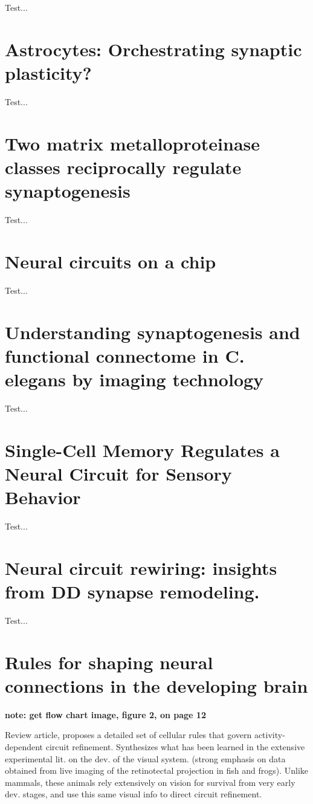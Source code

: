 \documentclass[11pt, a4paper, oneside]{article}   	%
\begin{document}
Test...

\section{Astrocytes: Orchestrating synaptic plasticity? \cite{DePitta2016}}

Test...

\section{Two matrix metalloproteinase classes reciprocally regulate synaptogenesis \cite{Dear2015}}

Test...

\section{Neural circuits on a chip \cite{Hasan2016}}

Test...

\section{Understanding synaptogenesis and functional connectome in C. elegans by imaging technology \cite{Hong2016}}

Test...

\section{Single-Cell Memory Regulates a Neural Circuit for Sensory Behavior \cite{Kobayashi2016}}

Test...

\section{Neural circuit rewiring: insights from DD synapse remodeling. \cite{Kurup2016}}

Test...

\section{Rules for shaping neural connections in the developing brain \cite{Kutsarova2016}}

\textbf{note: get flow chart image, figure 2, on page 12}

Review article, proposes a detailed set of cellular rules that govern activity-dependent circuit refinement. Synthesizes what has been learned in the extensive experimental lit. on the dev. of the visual system. (strong emphasis on data obtained from live imaging of the retinotectal projection in fish and frogs). Unlike mammals, these animals rely extensively on vision for survival from very early dev. stages, and use this same visual info to direct circuit refinement.
\end{document}
